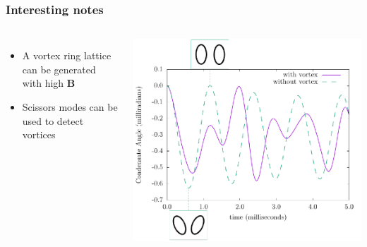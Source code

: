 \documentclass{beamer}
\begin{document}
\begin{frame}
\frametitle{Interesting notes}

\begin{columns}
\begin{itemize}
\item A vortex ring lattice can be generated with high $\mathbf{B}$
\item Scissors modes can be used to detect vortices
\end{itemize}
\includegraphics[width=\textwidth]{../data/3d/scissors_plot.pdf}

\end{columns}
\end{frame}
\end{document}
